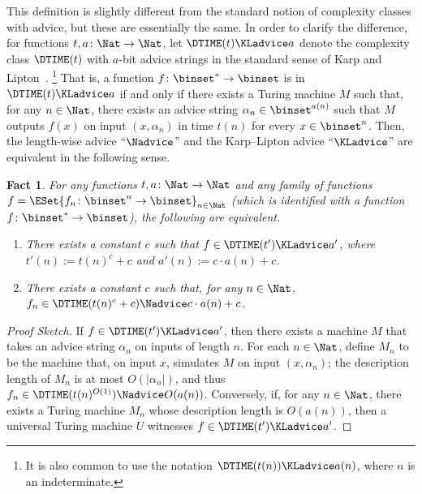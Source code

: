\documentclass[11pt]{article}
\numberwithin{equation}{section}
\newtheorem{fact}[theorem]{Fact}
\theoremstyle{definition}
\theoremstyle{plain}
\begin{document}
%
This definition is slightly different from the standard notion of complexity classes with advice,
but these are essentially the same.
In order to clarify the difference,
for functions $t, a \colon \Nat \to \Nat$,
let $\DTIME(t) \KLadvice a$ denote
the complexity class $\DTIME(t)$ with $a$-bit advice strings
in the standard sense of Karp and Lipton~\cite{KarpL82_advice}.%
\footnote{
  It is also common to use the notation $\DTIME(t(n)) \KLadvice a(n)$,
  where $n$ is an indeterminate.
}
That is, a function $f \colon \binset^* \to \binset$ is in $\DTIME(t) \KLadvice a$
if and only if
there exists a Turing machine $M$ such that, for any $n \in \Nat$,
there exists an advice string $\alpha_n \in \binset^{a(n)}$
such that
$M$ outputs $f(x)$ on input $(x, \alpha_n)$
in time $t(n)$
for every $x \in \binset^n$.
Then, the length-wise advice ``$\Nadvice$'' and the Karp--Lipton advice ``$\KLadvice$'' are
equivalent in the following sense.
\begin{fact}
  For any functions $t, a \colon \Nat \to \Nat$
  and any family of functions $f = \ESet{ f_n \colon \binset^n \to \binset }_{n \in \Nat}$
  \textup{(}which is identified with a function $f \colon \binset^* \to \binset$\textup{)},
  the following are equivalent.
  \begin{enumerate}
    \item
          There exists a constant $c$ such that $f \in \DTIME(t') \KLadvice a'$,
          where
          $t'(n) := t(n)^c + c$ and $a'(n) := c \cdot a(n) + c$.
    \item
          There exists a constant $c$ such that, for any $n \in \Nat$,
          $f_n \in \DTIME(t(n)^c + c) \Nadvice c \cdot a(n) + c$.
  \end{enumerate}
\end{fact}
\begin{proof}
  [Proof Sketch]
  If $f \in \DTIME(t') \KLadvice a'$,
  then there exists a machine $M$ that takes an advice string $\alpha_n$ on inputs of length $n$.
  For each $n \in \Nat$, define $M_n$ to be the machine that, on input $x$, simulates $M$ on input $(x, \alpha_n)$; the description length of $M_n$ is at most $O(|\alpha_n|)$, and thus $f_n \in \DTIME(t(n)^{O(1)}) \Nadvice O(a(n))$.
  Conversely, if, for any $n \in \Nat$, there exists a Turing machine $M_n$ whose description length is $O(a(n))$, then
  a universal Turing machine $U$ witnesses $f \in \DTIME(t') \KLadvice a'$.
\end{proof}
\end{document}
